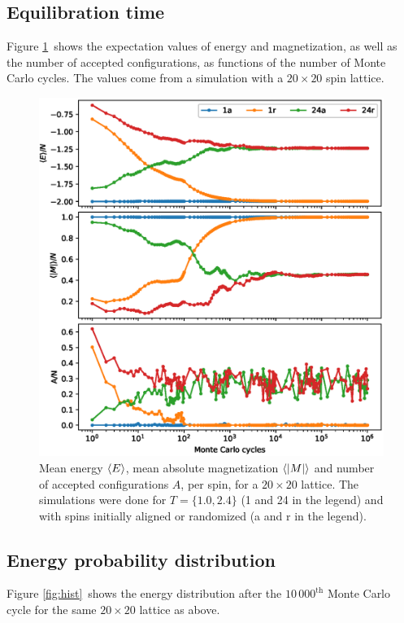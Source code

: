 \documentclass[a4paper,10pt,onecolumn]{article}
\begin{document}
\subsection{Equilibration time}
Figure \ref{fig:eq} shows the expectation values of energy and magnetization, as well as the number of accepted configurations, as functions of the number of Monte Carlo cycles. The values come from a simulation with a $20\times20$ spin lattice.

\begin{figure}
	\centering
	\includegraphics[width=\linewidth]{20mcs.eps}
	\caption{Mean energy $\expval{E}$, mean absolute magnetization $\expval{\abs{M}}$ and number of accepted configurations $A$, per spin, for a $20\times20$ lattice. The simulations were done for $T=\{1.0,2.4\}$ (1 and 24 in the legend) and with spins initially aligned or randomized (a and r in the legend).}
	\label{fig:eq}
\end{figure}

\subsection{Energy probability distribution}
Figure \ref{fig:hist} shows the energy distribution after the $10\,000^\mathrm{th}$ Monte Carlo cycle for the same $20\times20$ lattice as above. 
\end{document}
